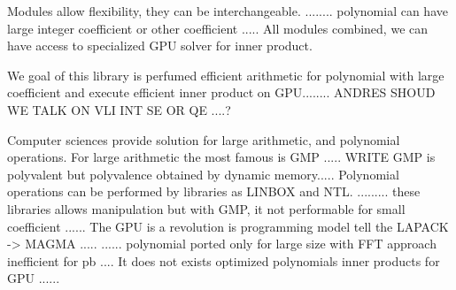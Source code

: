 \documentclass[oribibl]{llncs2e/llncs}
\begin{document}
Modules allow flexibility, they can be interchangeable. ........ polynomial can have large integer coefficient or other coefficient ..... All modules combined, we can have access to specialized GPU solver for inner product.

We goal of this library is perfumed efficient arithmetic for polynomial with large coefficient and execute efficient inner product on GPU........ ANDRES SHOUD WE TALK ON VLI INT SE OR QE ....? 

 Computer sciences provide solution for large arithmetic, and polynomial operations. For large arithmetic the most famous is GMP ..... WRITE GMP is polyvalent but polyvalence obtained by dynamic memory.....
 Polynomial operations can be performed by libraries as LINBOX and NTL. ......... these libraries allows manipulation but with GMP, it not performable for small coefficient ......   The GPU is a revolution is programming model tell the LAPACK -> MAGMA .....
...... polynomial ported only for large size with FFT approach inefficient for pb .... It does not exists optimized polynomials inner products for GPU ...... 




\end{document}
